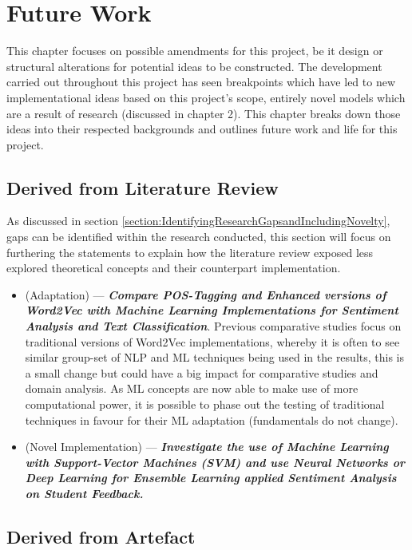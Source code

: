 \chapter{Future Work}

This chapter focuses on possible amendments for this project, be it design or structural alterations for potential ideas to be constructed. The development carried out throughout this project has seen breakpoints which have led to new implementational ideas based on this project’s scope, entirely novel models which are a result of research (discussed in chapter 2). This chapter breaks down those ideas into their respected backgrounds and outlines future work and life for this project.

\section{Derived from Literature Review} \label{section:DerivedfromLiteratureReview}

As discussed in section \ref{section:IdentifyingResearchGapsandIncludingNovelty}, gaps can be identified within the research conducted, this section will focus on furthering the statements to explain how the literature review exposed less explored theoretical concepts and their counterpart implementation.

\begin{itemize}
    \item (Adaptation) --- \textbf{\textit{Compare POS-Tagging and Enhanced versions of Word2Vec with Machine Learning Implementations for Sentiment Analysis and Text Classification}}. Previous comparative studies focus on traditional versions of Word2Vec implementations, whereby it is often to see similar group-set of NLP and ML techniques being used in the results, this is a small change but could have a big impact for comparative studies and domain analysis. As ML concepts are now able to make use of more computational power, it is possible to phase out the testing of traditional techniques in favour for their ML adaptation (fundamentals do not change).
    \item (Novel Implementation) --- \textbf{\textit{Investigate the use of Machine Learning with Support-Vector Machines (SVM) and use Neural Networks or Deep Learning for Ensemble Learning applied Sentiment Analysis on Student Feedback.}}
\end{itemize}

\section{Derived from Artefact}

